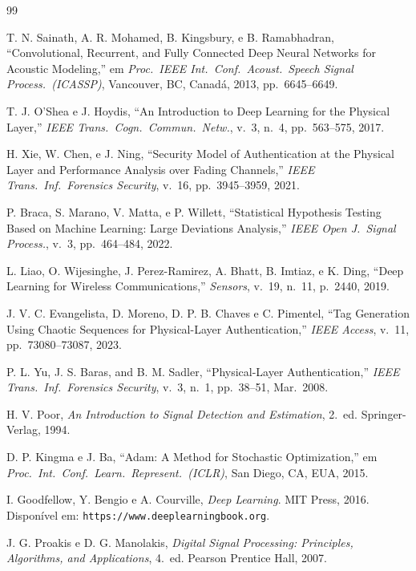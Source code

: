 \documentclass[12pt,a4paper]{article}
\begin{document}
\begin{thebibliography}{99}

 T. N. Sainath, A. R. Mohamed, B. Kingsbury, e B. Ramabhadran, ``Convolutional, Recurrent, and Fully Connected Deep Neural Networks for Acoustic Modeling,'' em \textit{Proc.\ IEEE Int.\ Conf.\ Acoust.\ Speech Signal Process.\ (ICASSP)}, Vancouver, BC, Canadá, 2013, pp.~6645--6649.

 T. J. O'Shea e J. Hoydis, ``An Introduction to Deep Learning for the Physical Layer,'' \textit{IEEE Trans.\ Cogn.\ Commun.\ Netw.}, v.~3, n.~4, pp.~563--575, 2017.

 H. Xie, W. Chen, e J. Ning, ``Security Model of Authentication at the Physical Layer and Performance Analysis over Fading Channels,'' \textit{IEEE Trans.\ Inf.\ Forensics Security}, v.~16, pp.~3945--3959, 2021.

 P. Braca, S. Marano, V. Matta, e P. Willett, ``Statistical Hypothesis Testing Based on Machine Learning: Large Deviations Analysis,'' \textit{IEEE Open J.\ Signal Process.}, v.~3, pp.~464--484, 2022.

 L. Liao, O. Wijesinghe, J. Perez-Ramirez, A. Bhatt, B. Imtiaz, e K. Ding, ``Deep Learning for Wireless Communications,'' \textit{Sensors}, v.~19, n.~11, p.~2440, 2019.

 J. V. C. Evangelista, D. Moreno, D. P. B. Chaves e C. Pimentel, ``Tag Generation Using Chaotic Sequences for Physical-Layer Authentication,'' \textit{IEEE Access}, v.~11, pp.~73080--73087, 2023.

 P. L. Yu, J. S. Baras, and B. M. Sadler, ``Physical-Layer Authentication,'' \textit{IEEE Trans.\ Inf.\ Forensics Security}, v.~3, n.~1, pp.~38--51, Mar.\ 2008.

 H. V. Poor, \textit{An Introduction to Signal Detection and Estimation}, 2.~ed. Springer-Verlag, 1994.

 D. P. Kingma e J. Ba, ``Adam: A Method for Stochastic Optimization,'' em \textit{Proc.\ Int.\ Conf.\ Learn.\ Represent.\ (ICLR)}, San Diego, CA, EUA, 2015.

 I. Goodfellow, Y. Bengio e A. Courville, \textit{Deep Learning}. MIT Press, 2016. Disponível em: \texttt{https://www.deeplearningbook.org}.

 J. G. Proakis e D. G. Manolakis, \textit{Digital Signal Processing: Principles, Algorithms, and Applications}, 4.~ed. Pearson Prentice Hall, 2007.


\end{thebibliography}
\end{document}
